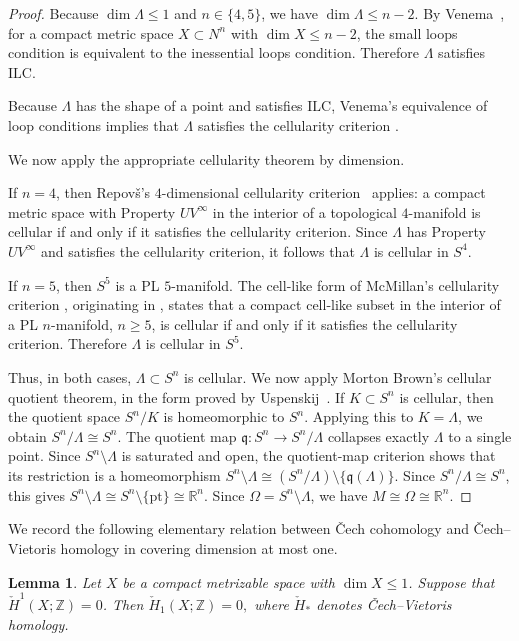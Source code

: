 \documentclass[12pt,oneside,a4paper]{article}
\theoremstyle{mytheorem}
\newtheorem{lemma}[definition]{Lemma}
\theoremstyle{remark}
\theoremstyle{definition}
\begin{document}
\begin{proof}
Because \(\dim\Lambda\le 1\) and \(n\in\{4,5\}\), we have
\(\dim\Lambda\le n-2\). By Venema~\cite[p.~444]{zbMATH03519593}, for a compact metric space \(X\subset N^n\) with \(\dim X\le n-2\), the small loops condition is equivalent to the inessential loops condition. Therefore \(\Lambda\)
satisfies \(\mathrm{ILC}\).

Because \(\Lambda\) has the shape of a point and satisfies \(\mathrm{ILC}\),
Venema's equivalence of loop conditions implies that \(\Lambda\) satisfies
the cellularity criterion \cite[p.~444]{zbMATH03519593}.

We now apply the appropriate cellularity theorem by dimension.

If \(n=4\), then Repov\v{s}'s \(4\)-dimensional cellularity criterion~\cite[Theorem, p.~564]{zbMATH04011439} applies:
a compact metric space with Property \(UV^\infty\) in the interior of a topological \(4\)-manifold
is cellular if and only if it satisfies the cellularity criterion. Since \(\Lambda\) has Property \(UV^\infty\) and satisfies the cellularity criterion, it follows that \(\Lambda\) is cellular in \(S^4\).

If \(n=5\), then \(S^5\) is a PL \(5\)-manifold. The cell-like form of
McMillan's cellularity criterion
\cite[Theorem~3.2.3, p.~107]{zbMATH05624618}, originating in
\cite[Theorem~1, p.~327]{zbMATH03190942}, states that a compact cell-like subset in
the interior of a PL \(n\)-manifold, \(n\ge 5\), is cellular if and only if it
satisfies the cellularity criterion. Therefore \(\Lambda\) is cellular in
\(S^5\).

Thus, in both cases, \(\Lambda\subset S^n\) is cellular. We now apply Morton
Brown's cellular quotient theorem, in the form proved by
Uspenskij~\cite[Theorem~1.3]{zbMATH05002651}. If \(K\subset S^n\) is
cellular, then the quotient space \(S^n/K\) is homeomorphic to \(S^n\).
Applying this to \(K=\Lambda\), we obtain
\(S^n/\Lambda\cong S^n\).
The quotient map
\(\mathfrak q\colon S^n\to S^n/\Lambda\)
collapses exactly \(\Lambda\) to a single point. Since
\(S^n\setminus\Lambda\) is saturated and open, the quotient-map criterion
shows that its restriction is a homeomorphism
\(S^n\setminus\Lambda \cong
(S^n/\Lambda)\setminus\{\mathfrak q(\Lambda)\}.\) Since
\(S^n/\Lambda\cong S^n\), this gives
\(S^n\setminus\Lambda \cong S^n\setminus\{\mathrm{pt}\}
\cong \mathbb R^n.\)
Since \(\Omega=S^n\setminus\Lambda\), we have
\(M\cong\Omega\cong\mathbb R^n\).
\end{proof}

We record the following elementary relation between \v{C}ech cohomology and
\v{C}ech--Vietoris homology in covering dimension at most one.
\begin{lemma}\label{Cech}
Let \(X\) be a compact metrizable space with \(\dim X\le 1\). Suppose that $\check H^{1}(X;\mathbb{Z}) = 0$. Then
$\check H_{1}(X;\mathbb{Z}) = 0,$ where $\check H_{*}$ denotes \v{C}ech--Vietoris homology.
\end{lemma}
\end{document}
